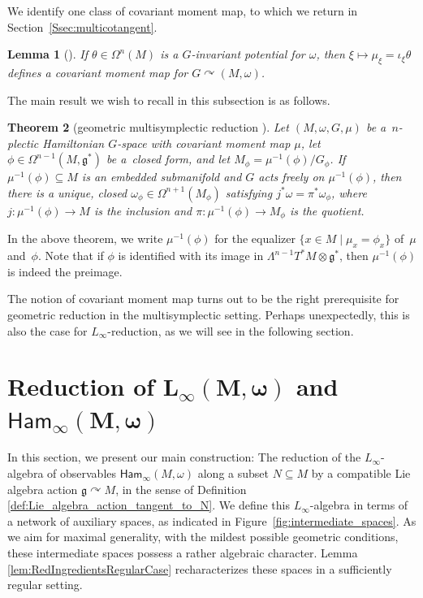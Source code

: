 \documentclass[10pt,a4paper]{amsart}
\numberwithin{equation}{section}
\newtheorem{Theorem}{Theorem}[section]
\newtheorem{Lemma}[Theorem]{Lemma}
\newcommand{\g}{\mathfrak{g}}
\newcommand{\Ham}{\mathsf{Ham}}
\renewcommand{\subset}{\subseteq}
\begin{document}
We identify one class of covariant moment map, to which we return in Section~\ref{Ssec:multicotangent}.

\begin{Lemma}[{\cite[Section~8.1]{CalliesFregierRogersZambon16}}]\label{lem:potinducesmom}
	If $\theta\in\Omega^n(M)$ is a $G$-invariant potential for $\omega$, then $\xi\mapsto\mu_\xi=\iota_\xi\theta$ defines a covariant moment map for $G\curvearrowright(M,\omega)$.
\end{Lemma}

The main result we wish to recall in this subsection is as follows.

\begin{Theorem}[geometric multisymplectic reduction {\cite[Theorem~1]{Blacker21}}]\label{thm:CaseyReduction}
	Let $(M,\omega,G,\mu)$ be a~$n$-plectic Hamiltonian $G$-space with covariant moment map $\mu$, let $\phi\in\Omega^{n-1}(M,\g^*)$ be a~closed form, and let $M_\phi= \mu^{-1}(\phi)/G_\phi$. If $\mu^{-1}(\phi)\subset M$ is an embedded submanifold and $G$ acts freely on $\mu^{-1}(\phi)$, then there is a unique, closed $\omega_\phi\in\Omega^{n+1}(M_\phi)$ satisfying $j^*\omega = \pi^*\omega_\phi$, where $j\colon \mu^{-1}(\phi)\to M$ is the inclusion and $\pi\colon \mu^{-1}(\phi)\to M_\phi$ is the quotient.
\end{Theorem}

In the above theorem, we write $\mu^{-1}(\phi)$ for the equalizer $\{x\in M \mid  \mu_x=\phi_x\}$ of~$\mu$ and~$\phi$. Note that if $\phi$ is identified with its image in $\Lambda^{n-1}T^*M\otimes\g^*$, then $\mu^{-1}(\phi)$ is indeed the pre\-image.

The notion of covariant moment map turns out to be the right prerequisite for geometric reduction in the multisymplectic setting. Perhaps unexpectedly, this is also the case for $L_\infty$-reduction, as we will see in the following section.

\section[Reduction of L\_infty(M,omega) and Ham\_infty(M,omega)]{Reduction of $\boldsymbol{L_\infty(M,\omega)}$ and $\boldsymbol{\Ham_\infty(M,\omega)}$}\label{Sec:CoreSection}

In this section, we present our main construction: The reduction of the $L_\infty$-algebra of observables $\Ham_\infty(M,\omega)$ along a subset $N\subset M$ by a compatible Lie algebra action $\g\curvearrowright M$, in the sense of Definition \ref{def:Lie_algebra_action_tangent_to_N}. We define this $L_\infty$-algebra in terms of a network of auxiliary spaces, as indicated in Figure~\ref{fig:intermediate_spaces}. As we aim for maximal generality, with the mildest possible geometric conditions, these intermediate spaces possess a rather algebraic character. Lemma \ref{lem:RedIngredientsRegularCase} recharacterizes these spaces in a sufficiently regular setting.
\end{document}
